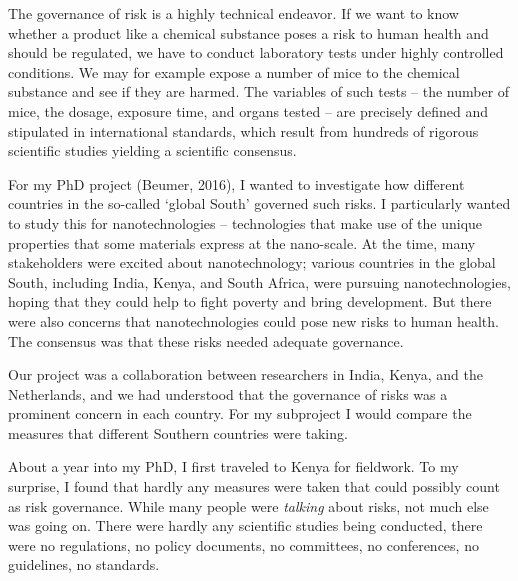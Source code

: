 \documentclass[authordate, empirical]{jote-new-article}
\author[1]{\mbox{Koen Beumer\orcid{0000-0003-4533-3581}}}
\affil[1]{Copernicus Institute of Sustainable Development, Utrecht University, Utrecht, the Netherlands}
\begin{document}
\begin{frontmatter}
  \maketitle
  \begin{abstract}
    \printabstracttext
  \end{abstract}
\end{frontmatter}




	The governance of risk is a highly technical endeavor. If we want to know whether a product like a chemical substance poses a risk to human health and should be regulated, we have to conduct laboratory tests under highly controlled conditions. We may for example expose a number of mice to the chemical substance and see if they are harmed. The variables of such tests -- the number of mice, the dosage, exposure time, and organs tested -- are precisely defined and stipulated in international standards, which result from hundreds of rigorous scientific studies yielding a scientific consensus.



	For my PhD project (Beumer, 2016), I wanted to investigate how different countries in the so-called ‘global South' governed such risks. I particularly wanted to study this for nanotechnologies -- technologies that make use of the unique properties that some materials express at the nano-scale. At the time, many stakeholders were excited about nanotechnology; various countries in the global South, including India, Kenya, and South Africa, were pursuing nanotechnologies, hoping that they could help to fight poverty and bring development. But there were also concerns that nanotechnologies could pose new risks to human health. The consensus was that these risks needed adequate governance.



	Our project was a collaboration between researchers in India, Kenya, and the Netherlands, and we had understood that the governance of risks was a prominent concern in each country. For my subproject I would compare the measures that different Southern countries were taking.



	About a year into my PhD, I first traveled to Kenya for fieldwork. To my surprise, I found that hardly any measures were taken that could possibly count as risk governance. While many people were \emph{talking }about risks, not much else was going on. There were hardly any scientific studies being conducted, there were no regulations, no policy documents, no committees, no conferences, no guidelines, no standards.
\end{document}
